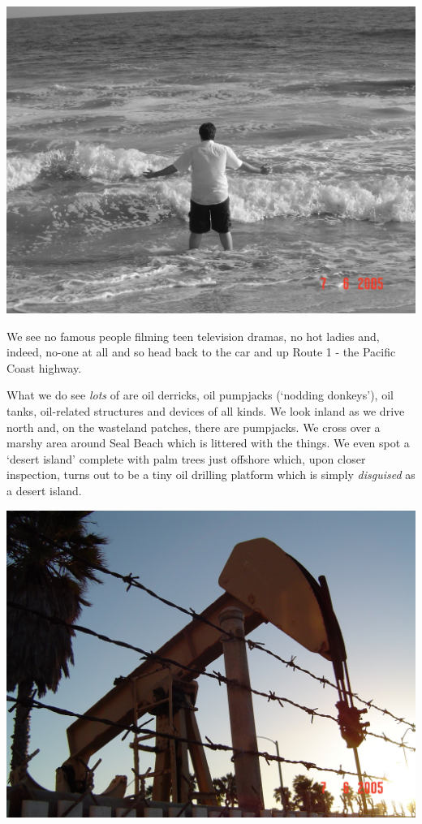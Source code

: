 \documentclass[a5paper,titlepage,11pt]{book}
\begin{document}
\begin{center}\includegraphics[width=\textwidth]{gfx/pacific}\end{center}

We see no famous people filming teen television dramas, no hot ladies and, indeed, no-one at all and so head back to the car and up Route 1 - the Pacific Coast highway.

What we do see \emph{lots} of are oil derricks, oil pumpjacks (`nodding donkeys'), oil tanks, oil-related structures and devices of all kinds. We look inland as we drive north and, on the wasteland patches, there are pumpjacks. We cross over a marshy area around Seal Beach which is littered with the things. We even spot a `desert island' complete with palm trees just offshore which, upon closer inspection, turns out to be a tiny oil drilling platform which is simply \emph{disguised} as a desert island.

\begin{center}\includegraphics[width=\textwidth]{gfx/pumpjack}\end{center}
\end{document}
